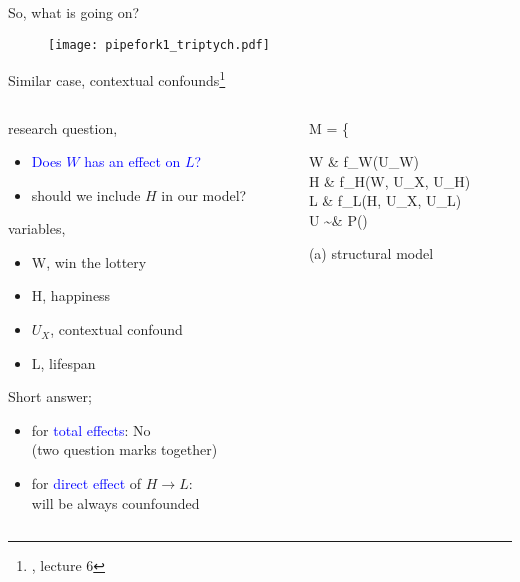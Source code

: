 %
%
\begin{frame}
	{So, what is going on?}
	
	\begin{figure*}
		\texttt{[image: pipefork1\_triptych.pdf]}
	\end{figure*}
\end{frame}
%
%
\begin{frame}
	{Similar case, contextual confounds\footnote{\citet{McElreath_2022}, lecture 6}}
	\begin{columns}
		\begin{column}{0.5\textwidth}
			research question, 
			\begin{itemize}
				\item \textcolor{blue}{Does $W$ has an effect on $L$?}
				\item should we include $H$ in our model?
			\end{itemize}
			
			variables,
			\begin{itemize}
				\item W, win the lottery 
				\item H, happiness
				\item $U_{X}$, contextual confound 
				\item L, lifespan
			\end{itemize}
			
			Short answer;
			\begin{itemize}
				\item for \textcolor{blue}{total effects}: No \\
				{\small (two question marks together)}
				\item for \textcolor{blue}{direct effect} of $H \rightarrow L$: \\
				will be always counfounded
			\end{itemize}
		\end{column}
		\begin{column}{0.5\textwidth}  
			\begin{equ}
				M = \left\{ \begin{aligned} 
					W \leftarrow & \; f_{W}(U_{W}) \\
					H \leftarrow & \; f_{H}(W, U_{X}, U_{H}) \\
					L \leftarrow & \; f_{L}(H, U_{X}, U_{L}) \\
					U \sim & \; P()
				\end{aligned} \right
				\caption*{(a) structural model}
			\end{equ}
			\begin{figure}
\end{figure}
\end{column}
\end{columns}
\end{frame}
